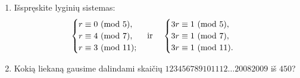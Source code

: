 \begin{enumerate}

  \item Išspręskite lyginių sistemas:
    $$\begin{cases}
      r \equiv 0 \ (\text{mod } 5),\\
      r \equiv 4 \ (\text{mod } 7),\\
      r \equiv 3 \ (\text{mod } 11);\\
    \end{cases}
    \text{ir }\phantom{ir}
    \begin{cases}
      3r \equiv 1 \ (\text{mod } 5),\\
      3r \equiv 1 \ (\text{mod } 7),\\
      3r \equiv 1 \ (\text{mod } 11).\\
    \end{cases}$$
  \item Kokią liekaną gausime dalindami skaičių $123456789101112\dots20082009$ iš
    $450$?

\end{enumerate}
